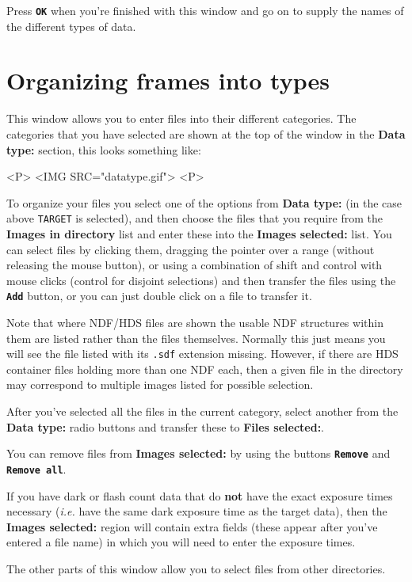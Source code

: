 \documentclass[11pt]{article}
\newcommand{\xlabel}[1]{}
\newcommand{\butt}[1]{{\bf \tt #1}}
\newcommand{\wlab}[1]{{\bf #1}}
\newcommand{\text}[1]{{\tt #1}}
\begin{document}
Press \butt{OK} when you're finished with this window and go on to
supply the names of the different types of data.

\section{Organizing frames into types \xlabel{CCDNDFDoImportWindow}}
This window allows you to enter files into their different categories.
The categories that you have selected are shown at the top of the
window in the \wlab{Data type:} section, this looks something like:
\begin{rawhtml}
<P>
<IMG SRC="datatype.gif">
<P>
\end{rawhtml}

To organize your files you select one of the options from
\wlab{Data type:} (in the case above \text{TARGET} is selected), and
then choose the files that you require from the 
\wlab{Images in directory} list and enter these into the 
\wlab{Images selected:} list. 
You can select files by clicking them, dragging the pointer over
a range (without releasing the mouse button), or using a combination
of shift and control with mouse clicks (control for disjoint
selections) and then transfer the files using the \butt{Add} button,
or you can just double click on a file to transfer it.

Note that where NDF/HDS files are shown the usable NDF structures
within them are listed rather than the files themselves.
Normally this just means you will see the file listed 
with its \text{.sdf} extension missing.  However, if there are HDS
container files holding more than one NDF each, then a given
file in the directory may correspond to multiple images listed
for possible selection.

After you've selected all the files in the current category, select
another from the \wlab{Data type:} radio buttons and transfer these to
\wlab{Files selected:}.

You can remove files from \wlab{Images selected:} by using the buttons
\butt{Remove} and \butt{Remove all}.

If you have dark or flash count data that do {\bf not} have the exact
exposure times necessary ({\em i.e.} have the same dark exposure time
as the target data), then the \wlab{Images selected:} region will contain
extra fields (these appear after you've entered a file name) in which
you will need to enter the exposure times.

The other parts of this window allow you to select files from other
directories.
\end{document}
